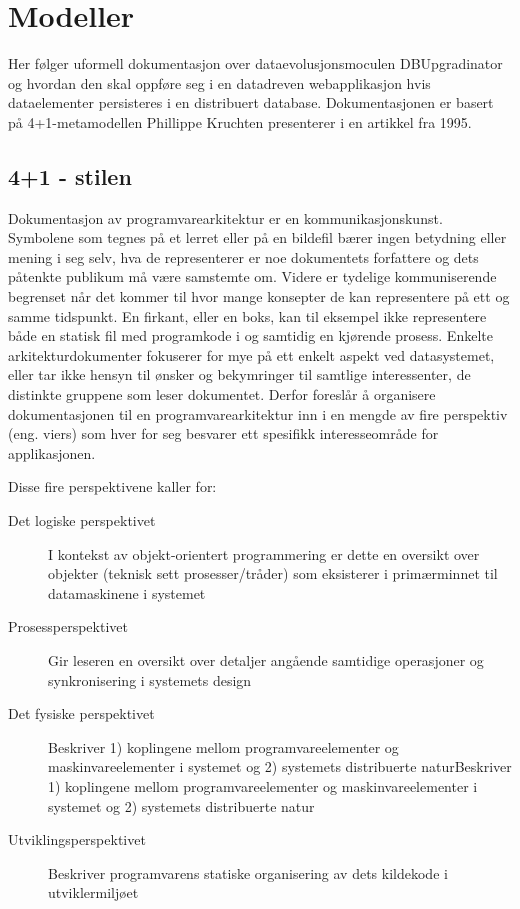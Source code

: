 \section{Modeller}

Her følger uformell dokumentasjon over dataevolusjonsmoculen DBUpgradinator og hvordan den skal oppføre seg i en datadreven webapplikasjon hvis dataelementer persisteres i en distribuert database. Dokumentasjonen er basert på 4+1-metamodellen Phillippe Kruchten presenterer i en artikkel fra 1995.

\subsection{4+1 - stilen}

Dokumentasjon av programvarearkitektur er en kommunikasjonskunst. Symbolene som tegnes på et lerret eller på en bildefil bærer ingen betydning eller mening i seg selv, hva de representerer er noe dokumentets forfattere og dets påtenkte publikum må være samstemte om. Videre er tydelige kommuniserende begrenset når det kommer til hvor mange konsepter de kan representere på ett og samme tidspunkt. En firkant, eller en boks, kan til eksempel ikke representere både en statisk fil med programkode i og samtidig en kjørende prosess. Enkelte arkitekturdokumenter fokuserer for mye på ett enkelt aspekt ved datasystemet, eller tar ikke hensyn til ønsker og bekymringer til samtlige interessenter, de distinkte gruppene som leser dokumentet. Derfor foreslår \cite{kruchten1995} å organisere dokumentasjonen til en programvarearkitektur inn i en mengde av fire perspektiv (eng. viers) som hver for seg besvarer ett spesifikk interesseområde for applikasjonen.

Disse fire perspektivene kaller \cite{kruchten1995} for:
\begin{description}
  \item [Det logiske perspektivet] I kontekst av objekt-orientert programmering er dette en oversikt over objekter (teknisk sett prosesser/tråder) som eksisterer i primærminnet til datamaskinene i systemet
  \item [Prosessperspektivet] Gir leseren en oversikt over detaljer angående samtidige operasjoner og synkronisering i systemets design
  \item [Det fysiske perspektivet] Beskriver 1) koplingene mellom programvareelementer og maskinvareelementer i systemet og 2) systemets distribuerte naturBeskriver 1) koplingene mellom programvareelementer og maskinvareelementer i systemet og 2) systemets distribuerte natur
  \item [Utviklingsperspektivet] Beskriver programvarens statiske organisering av dets kildekode i utviklermiljøet
\end{description}

